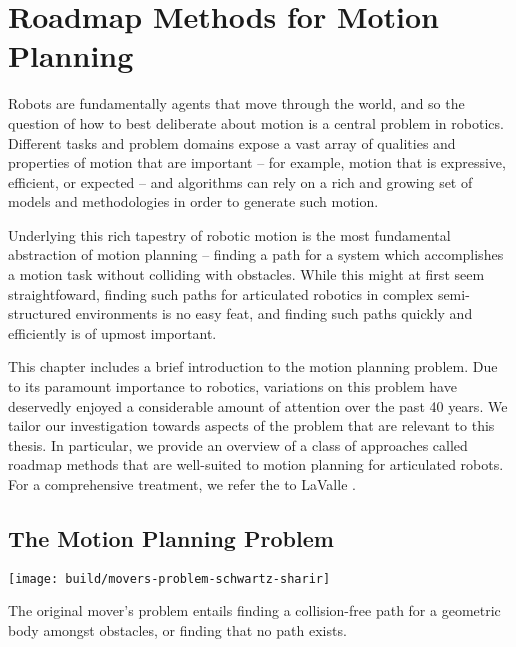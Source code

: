 \chapter{Roadmap Methods for Motion Planning}
\label{chap:roadmaps}

Robots are fundamentally agents that move through the world,
and so the question of how to best deliberate about motion
is a central problem in robotics.
Different tasks and problem domains expose a vast array of
qualities and properties of motion that are important
-- for example, motion that is expressive, efficient, or expected
-- and algorithms can rely on a rich and growing set
of models and methodologies in order to generate such motion.

Underlying this rich tapestry of robotic motion
is the most fundamental abstraction of motion planning --
finding a path for a system which accomplishes a motion task
without colliding with obstacles.
While this might at first seem straightfoward,
finding such paths for articulated robotics in
complex semi-structured environments
is no easy feat,
and finding such paths quickly and efficiently
is of upmost important.

This chapter includes a brief introduction to
the motion planning problem.
Due to its paramount importance to robotics,
variations on this problem have deservedly
enjoyed a considerable amount of attention over the past 40 years.
We tailor our investigation towards aspects of the problem
that are relevant to this thesis.
In particular,
we provide an overview of a class of approaches called roadmap methods
that are well-suited to motion planning for articulated robots.
For a comprehensive treatment,
we refer the to LaValle \citep{lavalle2006planningbook}.

\section{The Motion Planning Problem}

\begin{marginfigure}
   \centering
   \texttt{[image: build/movers-problem-schwartz-sharir]} %
   \caption{The original mover's problem
      \citep{schwartzsharir1983pianomovers1}
      entails finding a collision-free path for a geometric body
      amongst obstacles,
      or finding that no path exists.}
   \label{fig:roadmaps:movers}
\end{marginfigure}

